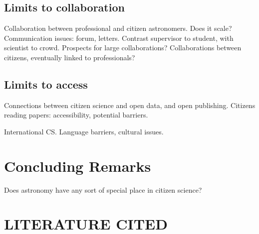 \documentclass{ar2e}
\begin{document}
\subsection{Limits to collaboration}
\label{sec:limits:collab}

Collaboration between professional and citizen astronomers. Does it scale?
Communication issues: forum, letters. Contrast supervisor to student, with
scientist to crowd. Prospects for large collaborations? Collaborations between
citizens, eventually linked to professionals?



\subsection{Limits to access}
\label{sec:limits:access}

Connections between citizen science and open data, and open publishing. 
Citizens reading papers: accessibility, potential barriers. 

International CS. Language barriers, cultural issues. 



\section{Concluding Remarks}
\label{sec:conclusions}

Does astronomy have any sort of special place in citizen science?




\section{LITERATURE CITED}





\end{document}
